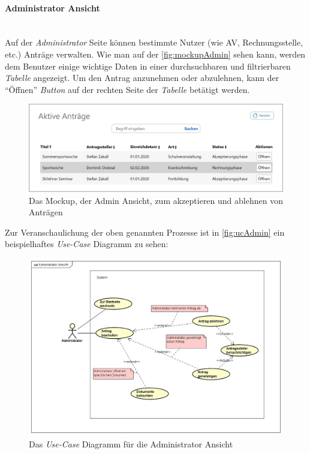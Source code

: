 \paragraph{Administrator Ansicht}
~\\
Auf der \textit{Administrator} Seite können bestimmte Nutzer (wie AV, Rechnungsstelle, etc.) Anträge verwalten. Wie man auf der \autoref{fig:mockupAdmin} sehen kann, werden dem Benutzer einige wichtige Daten in einer durchsuchbaren und filtrierbaren \textit{Tabelle} angezeigt. Um den Antrag anzunehmen oder abzulehnen, kann der \enquote{Öffnen} \textit{Button} auf der rechten Seite der \textit{Tabelle} betätigt werden.
\begin{figure}[H]
	\centering
	\includegraphics[width=1\linewidth]{images/ldehner_konzept/Mockup-Admin}
	\caption[Mockup Adminansicht]{Das Mockup, der Admin Ansicht, zum akzeptieren und ablehnen von Anträgen}
	\label{fig:mockupAdmin}
\end{figure}
Zur Veranschaulichung der oben genannten Prozesse ist in \autoref{fig:ucAdmin} ein beispielhaftes \textit{Use-Case} Diagramm zu sehen: 
\begin{figure}[H]
	\centering
	\includegraphics[width=1\linewidth]{images/ldehner_konzept/uc-admin}
	\caption[\textit{Use-Case} Diagramm Adminansicht]{Das \textit{Use-Case} Diagramm für die Administrator Ansicht}
	\label{fig:ucAdmin}
\end{figure}
